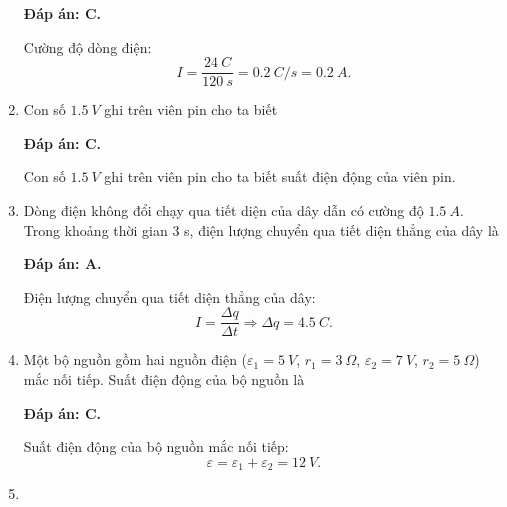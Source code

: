 \begin{enumerate}[label=\bfseries Câu \arabic*:]
{	}
	\loigiai
	{	\textbf{Đáp án: C.}
		
		Cường độ dòng điện:
		$$I=\dfrac{\SI{24}{C}}{\SI{120}{s}} = \SI{0.2}{C/s} = \SI{0.2}{A}.$$
	}
	\item {}
	
	\cauhoi
	{Con số $\SI{1.5}{V}$ ghi trên viên pin cho ta biết
		
	}
	\loigiai
	{	\textbf{Đáp án: C.}
		
		Con số $\SI{1.5}{V}$ ghi trên viên pin cho ta biết suất điện động của viên pin.
	}
	\item {}
	
	\cauhoi
	{Dòng điện không đổi chạy qua tiết diện của dây dẫn có cường độ $\SI{1.5}{A}$. Trong khoảng thời gian 3 s, điện lượng chuyển qua tiết diện thẳng của dây là
		
	}
	\loigiai
	{	\textbf{Đáp án: A.}
		
		Điện lượng chuyển qua tiết diện thẳng của dây:
		$$I=\dfrac{\Delta q}{\Delta t} \Rightarrow \Delta q=\SI{4.5}{C}.$$
	}
	\item {}
	
	\cauhoi
	{Một bộ nguồn gồm hai nguồn điện ($\varepsilon_1 = \SI{5}{V}$, $r_1=\SI{3}{\Omega}$, $\varepsilon_2 = \SI{7}{V}$, $r_2=\SI{5}{\Omega}$) mắc nối tiếp. Suất điện động của bộ nguồn là
		
	}
	\loigiai
	{	\textbf{Đáp án: C.}
		
		Suất điện động của bộ nguồn mắc nối tiếp:
		$$\varepsilon = \varepsilon_1 + \varepsilon_2 = \SI{12}{V}.$$
	}
	\item {}
	

\end{enumerate}

